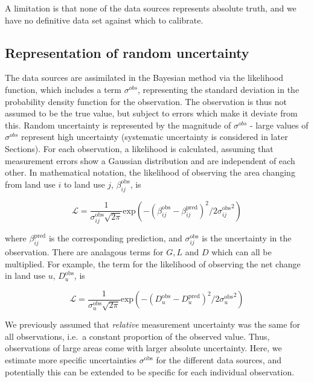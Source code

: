 \documentclass[
]{book}
\begin{document}
A limitation is that none of the data sources represents absolute truth, and we have no definitive data set against which to calibrate.

\hypertarget{representation-of-random-uncertainty}{%
\subsection{Representation of random uncertainty}\label{representation-of-random-uncertainty}}

The data sources are assimilated in the Bayesian method via the likelihood function, which includes a term \(\sigma^{obs}\), representing the standard deviation in the probability density function for the observation. The observation is thus not assumed to be the true value, but subject to errors which make it deviate from this. Random uncertainty is represented by the magnitude of \(\sigma^{obs}\) - large values of \(\sigma^{obs}\) represent high uncertainty (systematic uncertainty is considered in later Sections).
For each observation, a likelihood is calculated, assuming that measurement errors show a Gaussian distribution and are independent of each other.
In mathematical notation, the likelihood of observing the area changing from land use \(i\) to land use \(j\), \(\beta_{ij}^{\mathrm{obs}}\), is

\begin{equation} \label{eq:likBeta}
 \mathcal{L} = \frac{1}{\sigma_{ij}^\mathrm{obs} \sqrt{2\pi}} \mathrm{exp}(-(\beta_{ij}^{\mathrm{obs}} - \beta_{ij}^{\mathrm{pred}})^2/2 {\sigma_{ij}^\mathrm{obs}}^2)
\end{equation}

where \(\beta_{ij}^{\mathrm{pred}}\) is the corresponding prediction, and \(\sigma_{ij}^\mathrm{obs}\) is the uncertainty in the observation. There are analagous terms for \(G, L\) and \(D\) which can all be multiplied. For example, the term for the likelihood of observing the net change in land use \(u\), \(D_{u}^{\mathrm{obs}}\), is

\begin{equation} \label{eq:likNet}
 \mathcal{L} = \frac{1}{\sigma_{u}^\mathrm{obs} \sqrt{2\pi}} \mathrm{exp}(-(D_{u}^{\mathrm{obs}} - D_{u}^{\mathrm{pred}})^2/2 {\sigma_{u}^\mathrm{obs}}^2)
\end{equation}

We previously assumed that \emph{relative} measurement uncertainty was the same for all observations, i.e.~a constant proportion of the observed value. Thus, observations of large areas come with larger absolute uncertainty. Here, we estimate more specific uncertainties \(\sigma^\mathrm{obs}\) for the different data sources, and potentially this can be extended to be specific for each individual observation.
\end{document}
